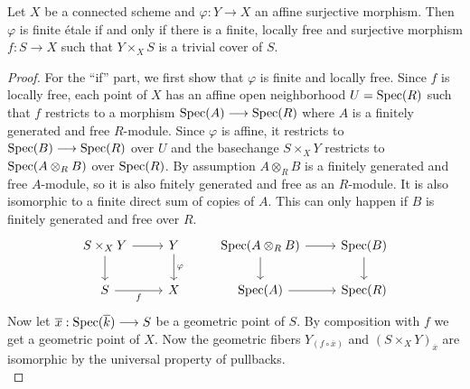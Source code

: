 \begin{theorem} 
  \label{locallyTrivial}
  Let $X$ be a connected scheme and $\varphi : Y \to X$ an affine surjective morphism. Then $\varphi$ is finite \'etale if and only if there is a finite, locally free and surjective morphism $f: S \to X$ such that $Y \times_X S$ is a trivial cover of $S$.
\end{theorem}
\begin{proof}
  For the ``if'' part, we first show that $\varphi$ is finite and locally free. Since $f$ is locally free, each point of $X$ has an affine open neighborhood $U = \operatorname{Spec}(R)$ such that $f$ restricts to a morphism $\operatorname{Spec}(A) \longrightarrow \operatorname{Spec}(R)$ where $A$ is a finitely generated and free $R$-module. Since $\varphi$ is affine, it restricts to $\operatorname{Spec}(B) \longrightarrow \operatorname{Spec}(R)$ over $U$ and the basechange $S \times_X Y$ restricts to $\operatorname{Spec}(A \otimes_R B)$ over $\operatorname{Spec}(R)$. By assumption $A \otimes_R B$ is a finitely generated and free $A$-module, so it is also fnitely generated and free as an $R$-module. It is also isomorphic to a finite direct sum of copies of $A$. This can only happen if $B$ is finitely generated and free over $R$.
    \[
    \begin{tikzcd}
    	{S \times_X Y} & Y & {\Spec(A \otimes_RB)} & {\Spec(B)} \\
    	S & X & {\Spec(A)} & {\Spec(R)}
    	\arrow["\varphi", from=1-2, to=2-2]
    	\arrow["f"', from=2-1, to=2-2]
    	\arrow[from=1-1, to=1-2]
    	\arrow[from=1-1, to=2-1]
    	\arrow[from=1-3, to=2-3]
    	\arrow[from=2-3, to=2-4]
    	\arrow[from=1-3, to=1-4]
    	\arrow[from=1-4, to=2-4]
    \end{tikzcd}
    \]
  Now let $\overline{x} : \operatorname{Spec}(\overline{k}) \longrightarrow S$ be a geometric point of $S$. By composition with $f$ we get a geometric point of $X$. Now the geometric fibers $Y_{(f \circ \overline{x})}$ and $(S \times_X Y)_{\overline{x}}$  are isomorphic by the universal property of pullbacks. 
  \[
\]
\end{proof}

